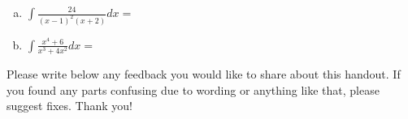 \documentclass[answers]{exam}
\begin{document}
\begin{questions}
\begin{enumerate}[(a)]
	\item $\displaystyle \int \frac{24}{(x-1)^2(x+2)} dx =$\\
	
	\vspace{2in}
	
	\item $\displaystyle \int \frac{x^4+6}{x^3+4x^2} dx =$

	\vspace{1in}
	

\end{enumerate}

\question Please write below any feedback you would like to share about this handout. If you found any parts confusing due to wording or anything like that, please suggest fixes. Thank you!

\end{questions}
\end{document}

